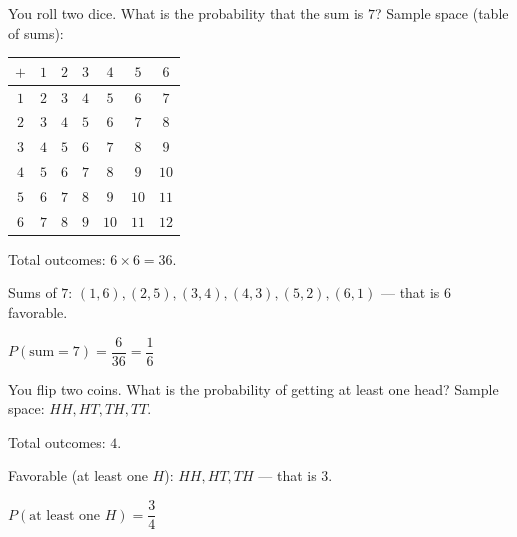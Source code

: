 \begin{stepExample}{You roll two dice. What is the probability that the sum is $7$?}
     Sample space (table of sums):

    \begin{center}
    \small
    \begin{tabular}{c|cccccc}
    $+$ & $1$ & $2$ & $3$ & $4$ & $5$ & $6$ \\ \hline
    $1$ & $2$ & $3$ & $4$ & $5$ & $6$ & $7$ \\
    $2$ & $3$ & $4$ & $5$ & $6$ & $7$ & $8$ \\
    $3$ & $4$ & $5$ & $6$ & $7$ & $8$ & $9$ \\
    $4$ & $5$ & $6$ & $7$ & $8$ & $9$ & $10$ \\
    $5$ & $6$ & $7$ & $8$ & $9$ & $10$ & $11$ \\
    $6$ & $7$ & $8$ & $9$ & $10$ & $11$ & $12$ \\
    \end{tabular}
    \end{center}

     Total outcomes: $6 \times 6 = 36$.

     Sums of $7$: $(1,6), (2,5), (3,4), (4,3), (5,2), (6,1)$ --- that is $6$ favorable.

     $P(\text{sum} = 7) = \dfrac{6}{36} = \dfrac{1}{6}$
\end{stepExample}

\begin{stepExample}{You flip two coins. What is the probability of getting at least one head?}
     Sample space: $HH, HT, TH, TT$.

     Total outcomes: $4$.

     Favorable (at least one $H$): $HH, HT, TH$ --- that is $3$.

     $P(\text{at least one } H) = \dfrac{3}{4}$
\end{stepExample}


